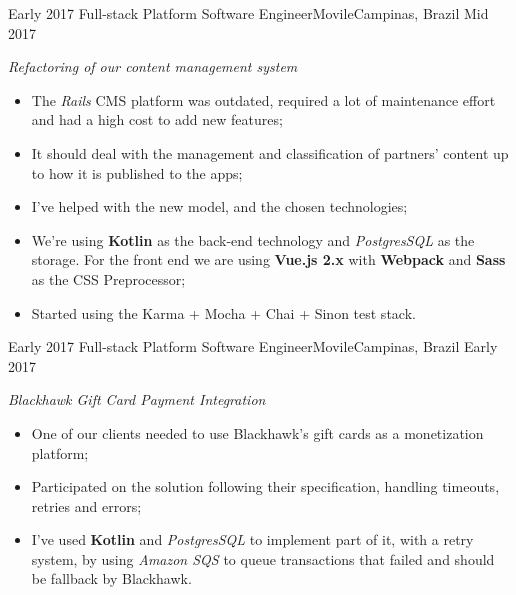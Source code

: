 %
%
%


\begin{experiences}
  \experience
  {Early 2017} {Full-stack Platform Software Engineer}{Movile}{Campinas, Brazil}
  {Mid 2017}
        {
        \emph{Refactoring of our content management system}\\
          \begin{itemize}
            \item The \emph{Rails} CMS platform was outdated, required a lot of maintenance effort and had a high cost to add new features;
            \item It should deal with the management and classification of partners' content up to how it is published to the apps;
            \item I've helped with the new model, and the chosen technologies;
            \item We're using \textbf{Kotlin} as the back-end technology and \emph{PostgresSQL} as the storage. For the front end we are using \textbf{Vue.js 2.x} with \textbf{Webpack} and \textbf{Sass} as the CSS Preprocessor;
            \item Started using the Karma + Mocha + Chai + Sinon test stack.\\
          \end{itemize}
        }{}
  \experience
  {Early 2017} {Full-stack Platform Software Engineer}{Movile}{Campinas, Brazil}
  {Early 2017}
        {
        \emph{Blackhawk Gift Card Payment Integration}\\
          \begin{itemize}
            \item One of our clients needed to use Blackhawk's gift cards as a monetization platform;
            \item Participated on the solution following their specification, handling timeouts, retries and errors;
            \item I've used \textbf{Kotlin} and \emph{PostgresSQL} to implement part of it, with a retry system, by using \emph{Amazon SQS} to queue
            transactions that failed and should be fallback by Blackhawk.\\

\end{itemize}}
\end{experiences}
